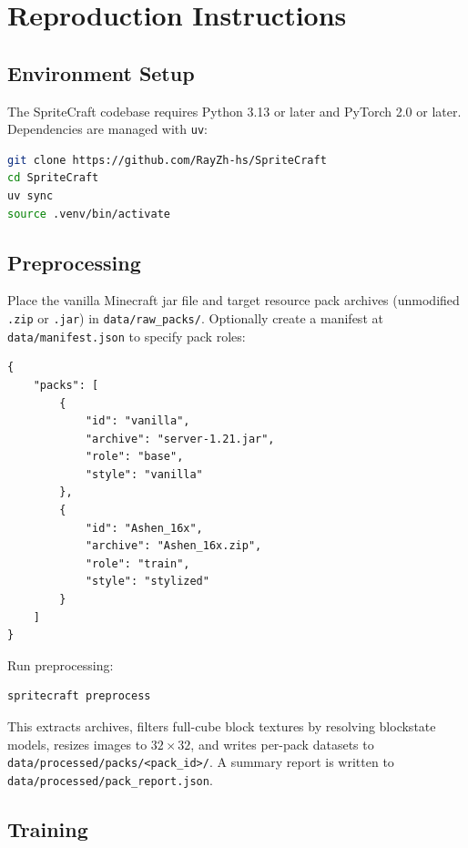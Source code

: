 \chapter{Reproduction Instructions}

\section{Environment Setup}

The SpriteCraft codebase requires Python 3.13 or later and PyTorch 2.0 or later. Dependencies are managed with \texttt{uv}:

\begin{lstlisting}[language=bash]
git clone https://github.com/RayZh-hs/SpriteCraft
cd SpriteCraft
uv sync
source .venv/bin/activate
\end{lstlisting}

\section{Preprocessing}

Place the vanilla Minecraft jar file and target resource pack archives (unmodified \texttt{.zip} or \texttt{.jar}) in \texttt{data/raw\_packs/}. Optionally create a manifest at \texttt{data/manifest.json} to specify pack roles:

\begin{lstlisting}[caption={Example manifest.json.}]
{
    "packs": [
        {
            "id": "vanilla",
            "archive": "server-1.21.jar",
            "role": "base",
            "style": "vanilla"
        },
        {
            "id": "Ashen_16x",
            "archive": "Ashen_16x.zip",
            "role": "train",
            "style": "stylized"
        }
    ]
}
\end{lstlisting}

Run preprocessing:

\begin{lstlisting}[language=bash]
spritecraft preprocess
\end{lstlisting}

This extracts archives, filters full-cube block textures by resolving blockstate models, resizes images to $32\times32$, and writes per-pack datasets to \texttt{data/processed/packs/<pack\_id>/}. A summary report is written to \texttt{data/processed/pack\_report.json}.

\section{Training}

